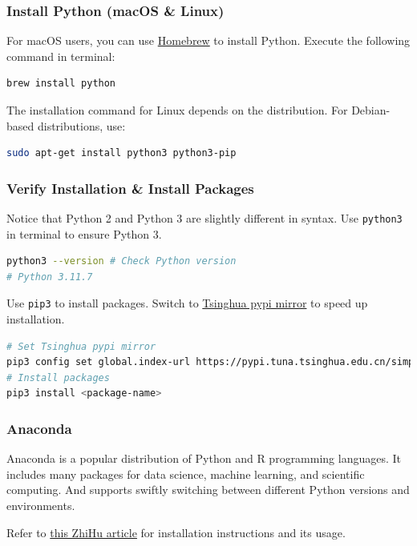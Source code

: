 \documentclass[beamer, en, version=2.0]{huangfusl-template}
\begin{document}
    \begin{frame}[fragile]
        \frametitle{Install Python (macOS \& Linux)}

        For macOS users, you can use \href{https://github.com/Homebrew/install}{\color{darkblue} Homebrew} to install Python. Execute the following command in terminal:

        \begin{lstlisting}[language=bash]
brew install python
        \end{lstlisting}

        The installation command for Linux depends on the distribution. For Debian-based distributions, use:

        \begin{lstlisting}[language=bash]
sudo apt-get install python3 python3-pip
        \end{lstlisting}

    \end{frame}
    \begin{frame}[fragile]
        \frametitle{Verify Installation \& Install Packages}

        Notice that Python 2 and Python 3 are slightly different in syntax. Use {\footnotesize\verb|python3|} in terminal to ensure Python 3.

        \begin{lstlisting}[language=bash]
python3 --version # Check Python version
# Python 3.11.7
        \end{lstlisting}

        Use {\footnotesize\verb|pip3|} to install packages. {\color{darkred} Switch to \href{https://mirrors.tuna.tsinghua.edu.cn/help/pypi/}{Tsinghua pypi mirror} to speed up installation}.

        \begin{lstlisting}[language=bash]
# Set Tsinghua pypi mirror
pip3 config set global.index-url https://pypi.tuna.tsinghua.edu.cn/simple
# Install packages
pip3 install <package-name>
        \end{lstlisting}

    \end{frame}
    \begin{frame}
        \frametitle{Anaconda}

        Anaconda is a popular distribution of Python and R programming languages. It includes many packages for data science, machine learning, and scientific computing. And supports swiftly switching between different Python versions and environments.

        Refer to \href{https://zhuanlan.zhihu.com/p/25198543}{\color{darkblue} this ZhiHu article} for installation instructions and its usage.
    \end{frame}
\end{document}
